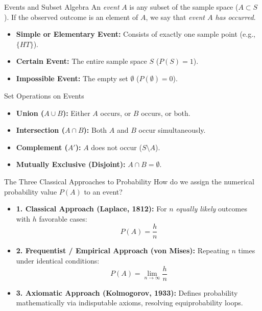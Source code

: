\documentclass[10pt,aspectratio=169]{beamer}
\begin{document}
\begin{frame}{Events and Subset Algebra}
  \small An \emph{event} $A$ is any subset of the sample space ($A \subset S$). If the observed outcome is an element of $A$, we say that \emph{event $A$ has occurred}. \pause

  \vspace{0.1em}
  \begin{itemize}\itemsep=0.1em
    \item \textbf{Simple or Elementary Event:} Consists of exactly one sample point (e.g., $\{HT\}$). \pause
    \item \textbf{Certain Event:} The entire sample space $S$ ($P(S) = 1$). \pause
    \item \textbf{Impossible Event:} The empty set $\emptyset$ ($P(\emptyset) = 0$).
  \end{itemize}

  \vspace{0.1em}
  \pause
  \begin{block}{Set Operations on Events}
    \begin{itemize}\itemsep=0.1em
      \item \textbf{Union ($A \cup B$):} Either $A$ occurs, or $B$ occurs, or both.
      \item \textbf{Intersection ($A \cap B$):} Both $A$ and $B$ occur simultaneously.
      \item \textbf{Complement ($A'$):} $A$ does not occur ($S \setminus A$).
      \item \textbf{Mutually Exclusive (Disjoint):} $A \cap B = \emptyset$.
    \end{itemize}
  \end{block}
\end{frame}

\begin{frame}{The Three Classical Approaches to Probability}
  \footnotesize How do we assign the numerical probability value $P(A)$ to an event? \pause

  \vspace{0.1em}
  \begin{itemize}\itemsep=0.2em
    \item \textbf{1. Classical Approach (Laplace, 1812):} For $n$ \emph{equally likely} outcomes with $h$ favorable cases:
    $$P(A) = \frac{h}{n}$$ \pause
    \item \textbf{2. Frequentist / Empirical Approach (von Mises):} Repeating $n$ times under identical conditions:
    $$P(A) = \lim_{n \to \infty} \frac{h}{n}$$ \pause
    \item \textbf{3. Axiomatic Approach (Kolmogorov, 1933):} Defines probability mathematically via indisputable axioms, resolving equiprobability loops.
  \end{itemize}
\end{frame}
\end{document}
